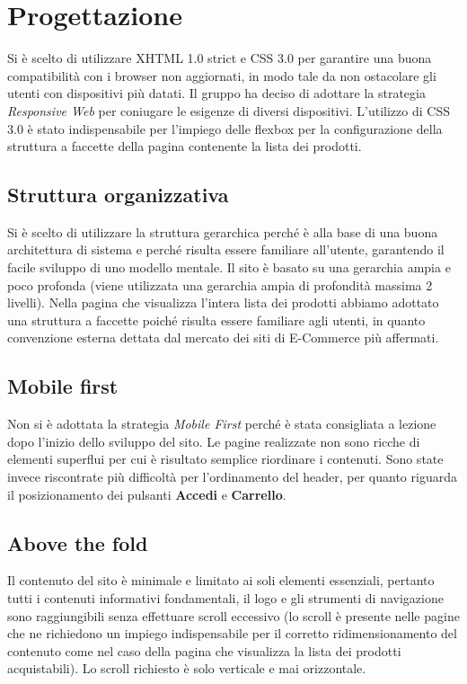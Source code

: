 \newpage
\section{Progettazione}
Si è scelto di utilizzare XHTML 1.0 strict e CSS 3.0 per garantire una buona compatibilità con i browser non aggiornati, in modo tale da non ostacolare gli utenti con dispositivi più datati.
Il gruppo ha deciso di adottare la strategia \textit{Responsive Web} per coniugare le esigenze di diversi dispositivi. L'utilizzo di CSS 3.0 è stato indispensabile per l'impiego delle flexbox per la configurazione della struttura a faccette della pagina contenente la lista dei prodotti.

\subsection{Struttura organizzativa} 
Si è scelto di utilizzare la struttura gerarchica perché è alla base di una buona architettura di sistema e perché risulta essere familiare all'utente, garantendo il facile sviluppo di uno modello mentale. Il sito è basato su una gerarchia ampia e poco profonda (viene utilizzata una gerarchia ampia di profondità massima 2 livelli).
Nella pagina che visualizza l'intera lista dei prodotti abbiamo adottato una struttura a faccette poiché risulta essere familiare agli utenti, in quanto convenzione esterna dettata dal mercato dei siti di E-Commerce più affermati.

\subsection{Mobile first}
Non si è adottata la strategia \textit{Mobile First} perché è stata consigliata a lezione dopo l'inizio dello sviluppo del sito. Le pagine realizzate non sono ricche di elementi superflui per cui è risultato semplice riordinare i contenuti. Sono state invece riscontrate più difficoltà per l'ordinamento del header, per quanto riguarda il posizionamento dei pulsanti \textbf{Accedi} e \textbf{Carrello}.

\subsection{Above the fold}
Il contenuto del sito è minimale e limitato ai soli elementi essenziali, pertanto tutti i contenuti informativi fondamentali, il logo e gli strumenti di navigazione sono raggiungibili senza effettuare scroll eccessivo (lo scroll è presente nelle pagine che ne richiedono un impiego indispensabile per il corretto ridimensionamento del contenuto come nel caso della pagina che visualizza la lista dei prodotti acquistabili). Lo scroll richiesto è solo verticale e mai orizzontale.


